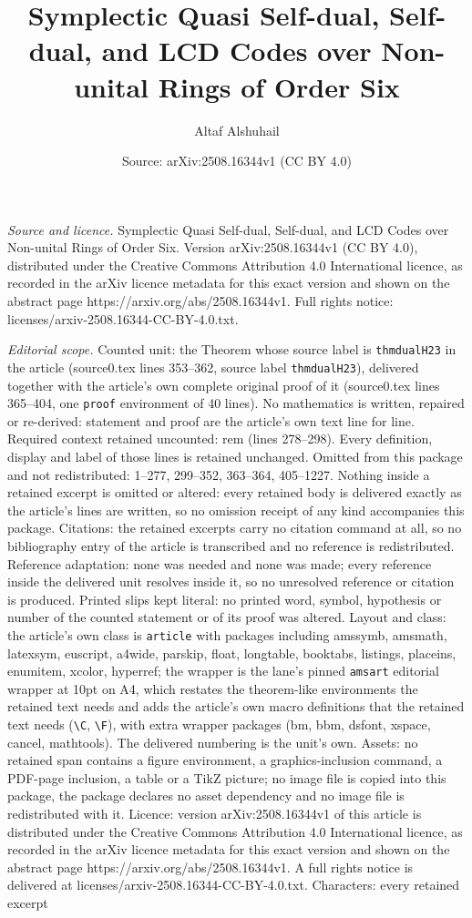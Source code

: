 \documentclass[10pt,a4paper]{amsart}
\title[Symplectic Quasi Self-dual, Self-dual, and LCD Codes over No]{Symplectic Quasi Self-dual, Self-dual, and LCD Codes over Non-unital Rings of Order Six}
\author{Altaf Alshuhail}
\date{Source: arXiv:2508.16344v1 (CC BY 4.0)}
\begin{document}
\maketitle

\noindent\emph{Source and licence.} Symplectic Quasi Self-dual, Self-dual, and LCD Codes over Non-unital Rings of Order Six. Version arXiv:2508.16344v1 (CC BY 4.0), distributed under the Creative Commons Attribution 4.0 International licence, as recorded in the arXiv licence metadata for this exact version and shown on the abstract page https://arxiv.org/abs/2508.16344v1. Full rights notice: licenses/arxiv-2508.16344-CC-BY-4.0.txt.\par\smallskip

\noindent\textit{Editorial scope.} Counted unit: the Theorem whose source label is \texttt{thmdualH23} in the article (source0.tex lines 353--362, source label \texttt{thmdualH23}), delivered together with the article's own complete original proof of it (source0.tex lines 365--404, one \texttt{proof} environment of 40 lines). No mathematics is written, repaired or re-derived: statement and proof are the article's own text line for line. Required context retained uncounted: rem (lines 278--298). Every definition, display and label of those lines is retained unchanged. Omitted from this package and not redistributed: 1--277, 299--352, 363--364, 405--1227. Nothing inside a retained excerpt is omitted or altered: every retained body is delivered exactly as the article's lines are written, so no omission receipt of any kind accompanies this package. Citations: the retained excerpts carry no citation command at all, so no bibliography entry of the article is transcribed and no reference is redistributed. Reference adaptation: none was needed and none was made; every reference inside the delivered unit resolves inside it, so no unresolved reference or citation is produced. Printed slips kept literal: no printed word, symbol, hypothesis or number of the counted statement or of its proof was altered. Layout and class: the article's own class is \texttt{article} with packages including amssymb, amsmath, latexsym, euscript, a4wide, parskip, float, longtable, booktabs, listings, placeins, enumitem, xcolor, hyperref; the wrapper is the lane's pinned \texttt{amsart} editorial wrapper at 10pt on A4, which restates the theorem-like environments the retained text needs and adds the article's own macro definitions that the retained text needs (\texttt{\textbackslash C}, \texttt{\textbackslash F}), with extra wrapper packages (bm, bbm, dsfont, xspace, cancel, mathtools). The delivered numbering is the unit's own. Assets: no retained span contains a figure environment, a graphics-inclusion command, a PDF-page inclusion, a table or a TikZ picture; no image file is copied into this package, the package declares no asset dependency and no image file is redistributed with it. Licence: version arXiv:2508.16344v1 of this article is distributed under the Creative Commons Attribution 4.0 International licence, as recorded in the arXiv licence metadata for this exact version and shown on the abstract page https://arxiv.org/abs/2508.16344v1. A full rights notice is delivered at licenses/arxiv-2508.16344-CC-BY-4.0.txt. Characters: every retained excerpt 
\end{document}
